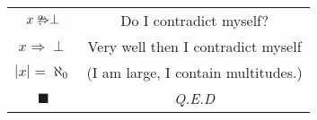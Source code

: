 \documentclass[preview,varwidth=true]{standalone}
\newcommand\qimplies{
  \mathrel{\ooalign{\hss$\Rightarrow$\hss\cr
  \kern0.1ex\lower0.2ex\hbox{\scalebox{1}{$?$}}}}}
\begin{document}
\begin{center}
\def\arraystretch{1.5}%
\begin{tabular}{ |c|c| } 
 \hline
 $ x \qimplies \perp $  & Do I contradict myself? \\ 
 $ x \Rightarrow \perp $ & Very well then I contradict myself \\ 
 $  | x | = \aleph_0 $ & (I am large, I contain multitudes.) \\ 
 $  \blacksquare $ & \textit{Q.E.D} \\ 
 \hline
\end{tabular}
\end{center}
\end{document}
